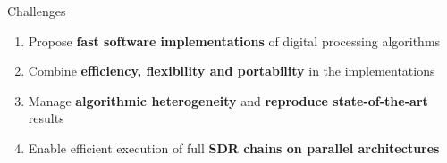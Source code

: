 \begin{frame}{Challenges}
  \vfill

  \begin{enumerate}
    \item Propose \textbf{fast software implementations} of digital processing algorithms
    \vspace{0.3cm}
    \item Combine \textbf{efficiency, flexibility and portability} in the implementations
    \vspace{0.3cm}
    \item Manage \textbf{algorithmic heterogeneity} and \textbf{reproduce state-of-the-art} results
    \vspace{0.3cm}
    \item Enable efficient execution of full \textbf{SDR chains on parallel architectures}
  \end{enumerate}

  \vfill
\end{frame}

